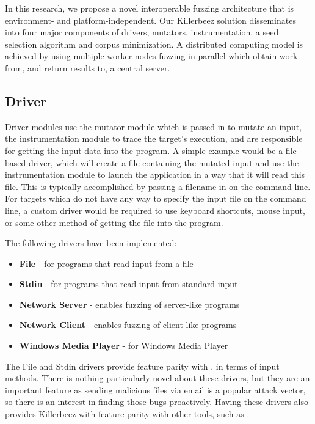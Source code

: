 In this research, we propose a novel interoperable fuzzing architecture that is
environment- and platform-independent. Our Killerbeez solution disseminates
into four major components of drivers, mutators, instrumentation, a seed
selection algorithm and corpus minimization. A distributed computing model is
achieved by using multiple worker nodes fuzzing in parallel which obtain work
from, and return results to, a central server.


\subsection{Driver} \label{Driver}
Driver modules use the mutator module which is passed in to mutate an input,
the instrumentation module to trace the target's execution, and are responsible
for getting the input data into the program.  A simple example would be a
file-based driver, which will create a file containing the mutated input and
use the instrumentation module to launch the application in a way that it will
read this file.  This is typically accomplished by passing a filename in on the
command line.  For targets which do not have any way to specify the input file
on the command line, a custom driver would be required to use keyboard
shortcuts, mouse input, or some other method of getting the file into the
program.

The following drivers have been implemented:
\begin{itemize}[noitemsep]
\item \textbf{File} - for programs that read input from a file
\item \textbf{Stdin} - for programs that read input from standard input
\item \textbf{Network Server} - enables fuzzing of server-like programs
\item \textbf{Network Client} - enables fuzzing of client-like programs
\item \textbf{Windows Media Player} - for Windows Media Player
\end{itemize}

The File and Stdin drivers provide feature parity with \AFL{}, in terms of input
methods. There is nothing particularly novel about these drivers, but they are
an important feature as sending malicious files via email is a popular attack
vector, so there is an interest in finding those bugs proactively. Having these
drivers also provides Killerbeez with feature parity with other tools, such as
\AFL{}.

